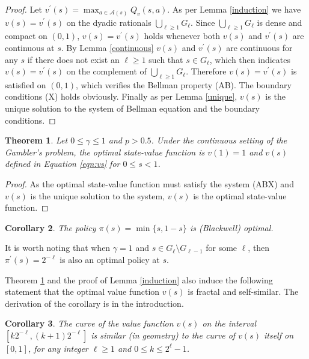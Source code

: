\documentclass{article}
\newtheorem{theorem}{Theorem}
\newtheorem{corollary}[theorem]{Corollary}
\theoremstyle{named}
\newcommand{\cA}{\mathcal{A}}
\begin{document}
\begin{proof}
Let $v^\prime(s)=\max_{a\in\cA(s)} Q_v(s,a)$. As per Lemma \ref{induction} we have $v(s)=v^\prime(s)$ on the dyadic rationals $\bigcup_{\ell\geq 1} G_\ell$. 
Since $\bigcup_{\ell\geq 1} G_\ell$ is dense and compact on $(0,1)$, $v(s)=v^\prime(s)$ holds whenever both $v(s)$ and $v^\prime(s)$ are continuous at $s$. 
By Lemma \ref{continuous} $v(s)$ and $v^\prime(s)$ are continuous for any $s$ if there does not exist an $\ell\ge 1$ such that $s\in G_\ell$, which then indicates $v(s)=v^\prime(s)$ on the complement of $\bigcup_{\ell\geq 1} G_\ell$. 
Therefore $v(s)=v^\prime(s)$ is satisfied on $(0,1)$, which verifies the Bellman property ({AB}). 
The boundary conditions ({X}) holds obviously. 
Finally as per Lemma \ref{unique}, $v(s)$ is the unique solution to the system of Bellman equation and the boundary conditions. 
\end{proof}

\begin{theorem}
\label{valuefunction}
Let $0\leq\gamma\leq 1$ and $p>0.5$. Under the continuous setting of the Gambler's problem, the optimal state-value function is $v(1)=1$ and $v(s)$ defined in Equation \eqref{eqn:vs} for $0\leq s<1$.
\end{theorem}

\begin{proof}
As the optimal state-value function must satisfy the system ({ABX}) and $v(s)$ is the unique solution to the system, $v(s)$ is the optimal state-value function.
\end{proof}



\begin{corollary}
\label{blackwell}
The policy $\pi(s)=\min\{s,1-s\}$ is (Blackwell) optimal. 
\end{corollary}

It is worth noting that when $\gamma=1$ and $s\in G_{\ell}\setminus G_{\ell-1}$ for some $\ell$, then $\pi^\prime(s)=2^{-\ell}$ is also an optimal policy at $s$.

Theorem \ref{valuefunction} and the proof of Lemma \ref{induction} also induce the following statement that the optimal value function $v(s)$ is fractal and self-similar. The derivation of the corollary is in the introduction.
\begin{corollary}
\label{thm:self-similar}
The curve of the value function $v(s)$ on the interval $[k2^{-\ell}, (k+1)2^{-\ell}]$ is similar (in geometry) to the curve of $v(s)$ itself on $[0,1]$, for any integer $\ell\geq 1$ and $0\leq k\leq 2^\ell-1$.
\end{corollary}
\end{document}

